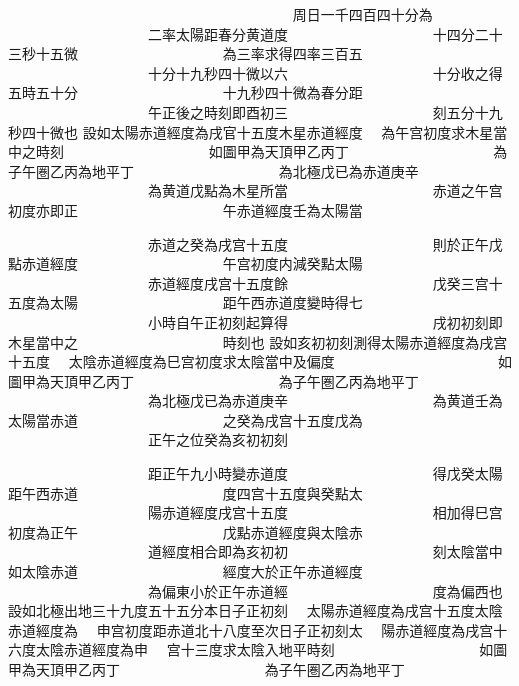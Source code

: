 \begin{正文}
　　　　　　　　　　周日一千四百四十分為
　　　　　　　　　　二率太陽距春分黄道度
　　　　　　　　　　十四分二十三秒十五微
　　　　　　　　　　為三率求得四率三百五
　　　　　　　　　　十分十九秒四十微以六
　　　　　　　　　　十分收之得五時五十分
　　　　　　　　　　十九秒四十微為春分距
　　　　　　　　　　午正後之時刻即酉初三
　　　　　　　　　　刻五分十九秒四十微也
設如太陽赤道經度為戌官十五度木星赤道經度
　為午宫初度求木星當中之時刻
　　　　　　　　　　如圖甲為天頂甲乙丙丁
　　　　　　　　　　為子午圏乙丙為地平丁
　　　　　　　　　　為北極戊已為赤道庚辛
　　　　　　　　　　為黄道戊點為木星所當
　　　　　　　　　　赤道之午宫初度亦即正
　　　　　　　　　　午赤道經度壬為太陽當
\par
\end{正文}\clearpage
{}
\begin{正文}
　　　　　　　　　　赤道之癸為戌宫十五度
　　　　　　　　　　則於正午戊點赤道經度
　　　　　　　　　　午宫初度内減癸點太陽
　　　　　　　　　　赤道經度戌宫十五度餘
　　　　　　　　　　戊癸三宫十五度為太陽
　　　　　　　　　　距午西赤道度變時得七
　　　　　　　　　　小時自午正初刻起算得
　　　　　　　　　　戌初初刻即木星當中之
　　　　　　　　　　時刻也
設如亥初初刻測得太陽赤道經度為戌宫十五度
　太陰赤道經度為巳宫初度求太陰當中及偏度
　　　　　　　　　　如圖甲為天頂甲乙丙丁
　　　　　　　　　　為子午圏乙丙為地平丁
　　　　　　　　　　為北極戊已為赤道庚辛
　　　　　　　　　　為黄道壬為太陽當赤道
　　　　　　　　　　之癸為戌宫十五度戊為
　　　　　　　　　　正午之位癸為亥初初刻
\par
\end{正文}\clearpage
{}
\begin{正文}
　　　　　　　　　　距正午九小時變赤道度
　　　　　　　　　　得戊癸太陽距午西赤道
　　　　　　　　　　度四宫十五度與癸點太
　　　　　　　　　　陽赤道經度戌宫十五度
　　　　　　　　　　相加得巳宫初度為正午
　　　　　　　　　　戊點赤道經度與太陰赤
　　　　　　　　　　道經度相合即為亥初初
　　　　　　　　　　刻太陰當中如太陰赤道
　　　　　　　　　　經度大於正午赤道經度
　　　　　　　　　　為偏東小於正午赤道經
　　　　　　　　　　度為偏西也
設如北極出地三十九度五十五分本日子正初刻
　太陽赤道經度為戌宫十五度太陰赤道經度為
　申宫初度距赤道北十八度至次日子正初刻太
　陽赤道經度為戌宫十六度太陰赤道經度為申
　宫十三度求太陰入地平時刻
　　　　　　　　　　如圖甲為天頂甲乙丙丁
　　　　　　　　　　為子午圏乙丙為地平丁
\par
\end{正文}\clearpage
